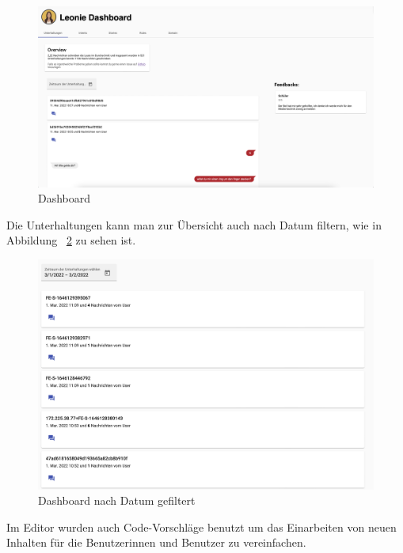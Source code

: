 \begin{figure}[hbt!]
    \centering
    \includegraphics[scale=0.2]{pics/dashboardConvo}
    \caption{Dashboard}
    \label{fig:impl:dashConv}
\end{figure}

Die Unterhaltungen kann man zur Übersicht auch nach Datum filtern, wie in Abbildung ~\ref{fig:impl:dashboardDate} zu sehen ist.

\begin{figure}[hbt!]
    \centering
    \includegraphics[scale=0.2]{pics/dashboardDate}
    \caption{Dashboard nach Datum gefiltert}
    \label{fig:impl:dashboardDate}
\end{figure}

Im Editor wurden auch Code-Vorschläge benutzt um das Einarbeiten von neuen Inhalten für die Benutzerinnen und Benutzer zu vereinfachen.

